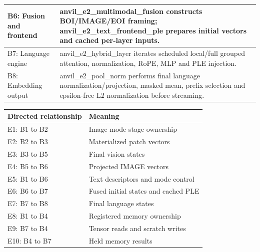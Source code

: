 \documentclass[11pt,a4paper]{article}
\begin{document}
{\begin{longtable}{@{}L{0.24\textwidth}|L{0.7\textwidth}@{}}
B6: Fusion and frontend & anvil\_\allowbreak{}e2\_\allowbreak{}multimodal\_\allowbreak{}fusion constructs BOI/\allowbreak{}IMAGE/\allowbreak{}EOI framing; anvil\_\allowbreak{}e2\_\allowbreak{}text\_\allowbreak{}frontend\_\allowbreak{}ple prepares initial vectors and cached per-layer inputs.\\[2pt]\hline

B7: Language engine & anvil\_\allowbreak{}e2\_\allowbreak{}hybrid\_\allowbreak{}layer iterates scheduled local/\allowbreak{}full grouped attention,\allowbreak{} normalization,\allowbreak{} RoPE,\allowbreak{} MLP and PLE injection.\\[2pt]\hline

B8: Embedding output & anvil\_\allowbreak{}e2\_\allowbreak{}pool\_\allowbreak{}norm performs final language normalization/\allowbreak{}projection,\allowbreak{} masked mean,\allowbreak{} prefix selection and epsilon-free L2 normalization before streaming.\\[2pt]\hline

\bottomrule\end{longtable}}

{\small\renewcommand{\arraystretch}{1.18}\begin{longtable}{@{}L{0.24\textwidth}|L{0.7\textwidth}@{}}\toprule

\textbf{Directed relationship} & \textbf{Meaning}\\\midrule\endhead

E1: B1 to B2 & Image-mode stage ownership\\[2pt]\hline

E2: B2 to B3 & Materialized patch vectors\\[2pt]\hline

E3: B3 to B5 & Final vision states\\[2pt]\hline

E4: B5 to B6 & Projected IMAGE vectors\\[2pt]\hline

E5: B1 to B6 & Text descriptors and mode control\\[2pt]\hline

E6: B6 to B7 & Fused initial states and cached PLE\\[2pt]\hline

E7: B7 to B8 & Final language states\\[2pt]\hline

E8: B1 to B4 & Registered memory ownership\\[2pt]\hline

E9: B7 to B4 & Tensor reads and scratch writes\\[2pt]\hline

E10: B4 to B7 & Held memory results\\[2pt]\hline

\bottomrule\end{longtable}}
\end{document}
